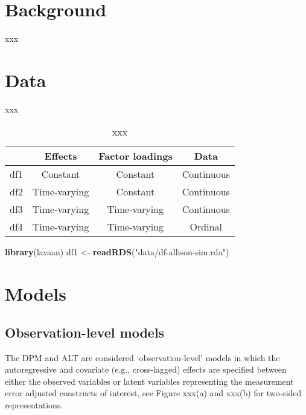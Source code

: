 \documentclass[]{interact}
\theoremstyle{plain}%
\theoremstyle{definition}
\theoremstyle{remark}
\newenvironment{Shaded}{\begin{snugshade}}{\end{snugshade}}
\newcommand{\KeywordTok}[1]{\textcolor[rgb]{0.13,0.29,0.53}{\textbf{#1}}}
\newcommand{\NormalTok}[1]{#1}
\newcommand{\StringTok}[1]{\textcolor[rgb]{0.31,0.60,0.02}{#1}}
\begin{document}
\hypertarget{background}{%
\section{Background}\label{background}}

xxx

\hypertarget{data}{%
\section{Data}\label{data}}

xxx

\begin{table}
\begin{tabular}{l c c c}
\toprule
    & Effects      & Factor loadings & Data \\
\midrule
df1 & Constant     & Constant        & Continuous \\
df2 & Time-varying & Constant        & Continuous \\
df3 & Time-varying & Time-varying    & Continuous \\
df4 & Time-varying & Time-varying    & Ordinal \\
\bottomrule
\end{tabular} \vspace{3pt}
\caption{xxx} 
\label{xxx}
\end{table}

\begin{Shaded}
\begin{Highlighting}[]
\KeywordTok{library}\NormalTok{(lavaan)}
\NormalTok{df1 \textless{}{-}}\StringTok{ }\KeywordTok{readRDS}\NormalTok{(}\StringTok{"data/df{-}allison{-}sim.rda"}\NormalTok{)}
\end{Highlighting}
\end{Shaded}

\hypertarget{models}{%
\section{Models}\label{models}}

\hypertarget{observation-level-models}{%
\subsection{Observation-level models}\label{observation-level-models}}

The DPM and ALT are considered `observation-level' models in which the
autoregressive and covariate (e.g., cross-lagged) effects are specified
between either the observed variables or latent variables representing
the measurement error adjusted constructs of interest, see Figure xxx(a)
and xxx(b) for two-sided representations.
\end{document}
